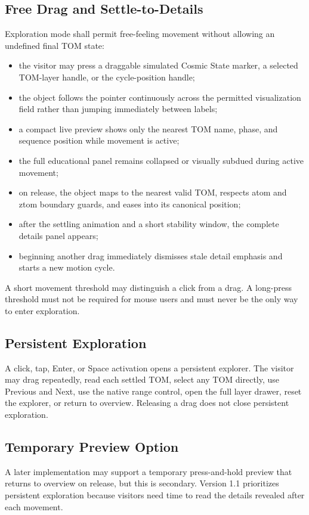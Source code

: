 \documentclass[11pt,letterpaper]{article}
\begin{document}
\subsection{Free Drag and Settle-to-Details}
Exploration mode shall permit free-feeling movement without allowing an undefined final TOM state:
\begin{itemize}
\item the visitor may press a draggable simulated Cosmic State marker, a selected TOM-layer handle, or the cycle-position handle;
\item the object follows the pointer continuously across the permitted visualization field rather than jumping immediately between labels;
\item a compact live preview shows only the nearest TOM name, phase, and sequence position while movement is active;
\item the full educational panel remains collapsed or visually subdued during active movement;
\item on release, the object maps to the nearest valid TOM, respects atom and ztom boundary guards, and eases into its canonical position;
\item after the settling animation and a short stability window, the complete details panel appears;
\item beginning another drag immediately dismisses stale detail emphasis and starts a new motion cycle.
\end{itemize}
A short movement threshold may distinguish a click from a drag. A long-press threshold must not be required for mouse users and must never be the only way to enter exploration.

\subsection{Persistent Exploration}
A click, tap, Enter, or Space activation opens a persistent explorer. The visitor may drag repeatedly, read each settled TOM, select any TOM directly, use Previous and Next, use the native range control, open the full layer drawer, reset the explorer, or return to overview. Releasing a drag does not close persistent exploration.

\subsection{Temporary Preview Option}
A later implementation may support a temporary press-and-hold preview that returns to overview on release, but this is secondary. Version 1.1 prioritizes persistent exploration because visitors need time to read the details revealed after each movement.
\end{document}
